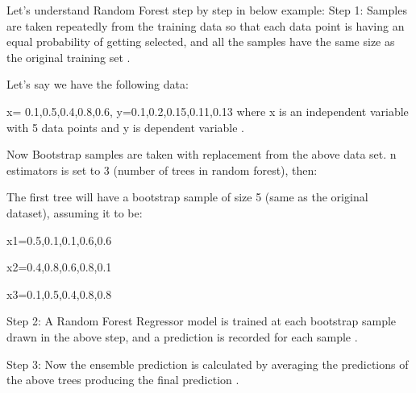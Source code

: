 \documentclass[]{llncs} %
\begin{document}
Let's understand Random Forest step by step in below example:
Step 1: Samples are taken repeatedly from the training data so that each data point is having an equal probability of getting selected, and all the samples have the same size as the original training set \cite{RandomForest}.\par
Let's say we have the following data:\par
x= 0.1,0.5,0.4,0.8,0.6, y=0.1,0.2,0.15,0.11,0.13 where x is an independent variable with 5 data points and y is dependent variable \cite{RandomForest}.\par
Now Bootstrap samples are taken with replacement from the above data set. n estimators is set to 3 (number of trees in random forest), then:\par
The first tree will have a bootstrap sample of size 5 (same as the original dataset), assuming it to be: \par
x1={0.5,0.1,0.1,0.6,0.6}\par
x2={0.4,0.8,0.6,0.8,0.1}\par
x3={0.1,0.5,0.4,0.8,0.8}\par
Step 2: A Random Forest Regressor model is trained at each bootstrap sample drawn in the above step, and a prediction is recorded for each sample \cite{RandomForest}.\par
Step 3: Now the ensemble prediction is calculated by averaging the predictions of the above trees producing the final prediction \cite{RandomForest}.\par
\end{document}

